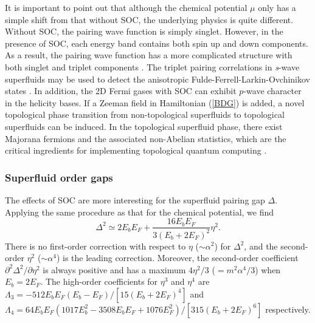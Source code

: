 \documentclass[pra,print,showpacs,superscriptaddress,twocolumn]{revtex4}
\begin{document}
It is important to point out that although the chemical potential $\mu $
only has a simple shift from that without SOC, the underlying physics is
quite different. Without SOC, the pairing wave function is simply singlet.
However, in the presence of SOC, each energy band contains both spin up and
down components. As a result, the pairing wave function has a more
complicated structure with both singlet and triplet components \cite{LPG}.
The triplet pairing correlations in \textit{s}-wave superfluids may be used
to detect the anisotropic Fulde-Ferrell-Larkin-Ovchinikov states \cite{IZ}.
In addition, the 2D Fermi gases with SOC can exhibit $p$-wave character in
the helicity bases. If a Zeeman field in Hamiltonian (\ref{BDG}) is added, a
novel topological phase transition from non-topological superfluids to
topological superfluids can be induced. In the topological superfluid phase,
there exist Majorana fermions and the associated non-Abelian statistics,
which are the critical ingredients for implementing topological quantum
computing \cite{Zhang}.

\subsubsection{Superfluid order gaps}

The effects of SOC are more interesting for the superfluid pairing gap $%
\Delta $. Applying the same procedure as that for the chemical potential, we
find
\begin{equation}
\Delta ^{2}\simeq 2E_{b}E_{F}+\frac{16E_{b}E_{F}}{3(E_{b}+2E_{F})^{2}}\eta
^{2}.  \label{MSTG}
\end{equation}%
There is no first-order correction with respect to $\eta $ ($\sim \alpha ^{2}
$) for $\Delta ^{2}$, and the second-order $\eta ^{2}$ ($\sim \alpha ^{4}$)
is the leading correction. Moreover, the second-order coefficient $\partial
^{2}\Delta ^{2}/\partial \eta ^{2}$ is always positive and has a maximum $%
4\eta ^{2}/3$ ($=m^{2}\alpha ^{4}/3$) when $E_{b}=2E_{F}$. The high-order
coefficients for $\eta ^{3}$ and $\eta ^{4}$ are $\Lambda
_{3}=-512E_{b}E_{F}(E_{b}-E_{F})/[15(E_{b}+2E_{F})^{4}]$ and $\Lambda
_{4}=64E_{b}E_{F}(1017E_{b}^{2}-3508E_{b}E_{F}+1076E_{F}^{2})/[315(E_{b}+2E_{F})^{6}]
$ respectively.
\end{document}

